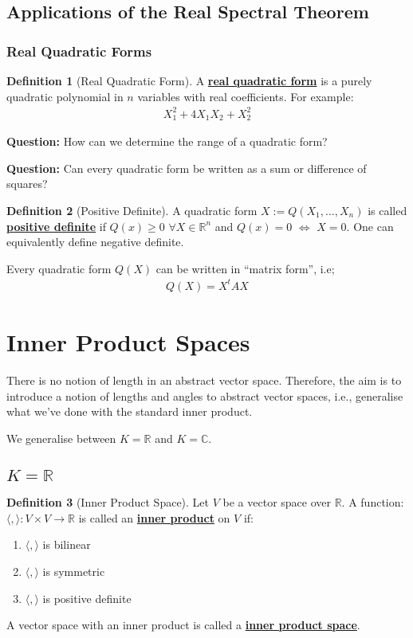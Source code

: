 \documentclass[11pt]{scrartcl}
\newcommand{\R}[0]{\mathbb{R}}
\theoremstyle{definition}
\newtheorem{definition}{Definition}
\theoremstyle{remark}
\newcommand{\dfn}[1]{\textbf{\underline{#1}}}
\newcommand{\C}[0]{\mathbb{C}}
\begin{document}
\subsection{Applications of the Real Spectral Theorem}
\subsubsection{Real Quadratic Forms}
\begin{definition}[Real Quadratic Form]
	A \dfn{real quadratic form} is a purely quadratic polynomial in $n$ variables with real coefficients. For example: 
	\begin{align}
		X_1^2 + 4X_1X_2 + X_2^2	
	\end{align}
\end{definition}

\textbf{Question:} How can we determine the range of a quadratic form? 

\textbf{Question:} Can every quadratic form be written as a sum or difference of squares?

\begin{definition}[Positive Definite]
	A quadratic form $X := Q(X_1, ..., X_n)$ is called \dfn{positive definite} if $Q(x) \geq 0$ $\forall X \in \R^n$ and $Q(x) = 0 $ $\iff$ $X =0$. One can equivalently define negative definite. 
\end{definition}

Every quadratic form $Q(X)$ can be written in ``matrix form'', i.e; 
\begin{align}
	Q(X) = X^t A X	
\end{align}

\section{Inner Product Spaces}
There is no notion of length in an abstract vector space. Therefore, the aim is to introduce a notion of lengths and angles to abstract vector spaces, i.e., generalise what we've done with the standard inner product. 

We generalise between $K = \R$ and $K= \C$. 
\subsection{$K = \R$}
\begin{definition}[Inner Product Space] Let $V$ be a vector space over $\R$. A function: $\langle, \rangle: V \times V \rightarrow \R$ is called an \dfn{inner product} on $V$ if: 
\begin{enumerate}[noitemsep]
	\item $\langle, \rangle$ is bilinear
	\item $\langle, \rangle$ is symmetric 
	\item $\langle, \rangle$ is positive definite 
\end{enumerate}
	A vector space with an inner product is called a \dfn{inner product space}. 
\end{definition}
\end{document}
